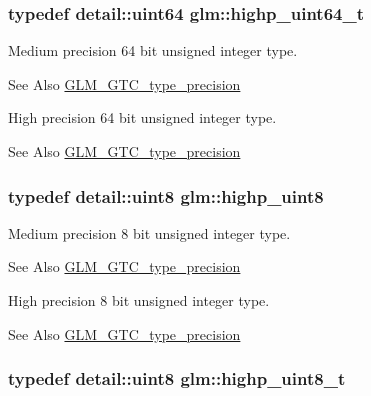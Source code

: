 \hypertarget{group__gtc__type__precision_ga6e66f40c5909bfc872b068187fa6029e}{
\subsubsection[{highp\-\_\-uint64\-\_\-t}]{\setlength{\rightskip}{0pt plus 5cm}typedef detail\-::uint64 {\bf glm\-::highp\-\_\-uint64\-\_\-t}}}\label{group__gtc__type__precision_ga6e66f40c5909bfc872b068187fa6029e}
Medium precision 64 bit unsigned integer type. \begin{DoxySeeAlso}{See Also}
\hyperlink{group__gtc__type__precision}{G\-L\-M\-\_\-\-G\-T\-C\-\_\-type\-\_\-precision}
\end{DoxySeeAlso}
High precision 64 bit unsigned integer type. \begin{DoxySeeAlso}{See Also}
\hyperlink{group__gtc__type__precision}{G\-L\-M\-\_\-\-G\-T\-C\-\_\-type\-\_\-precision} 
\end{DoxySeeAlso}
\hypertarget{group__gtc__type__precision_ga2c27c6dd26e893786f04b10f99c1ee95}{
\subsubsection[{highp\-\_\-uint8}]{\setlength{\rightskip}{0pt plus 5cm}typedef detail\-::uint8 {\bf glm\-::highp\-\_\-uint8}}}\label{group__gtc__type__precision_ga2c27c6dd26e893786f04b10f99c1ee95}
Medium precision 8 bit unsigned integer type. \begin{DoxySeeAlso}{See Also}
\hyperlink{group__gtc__type__precision}{G\-L\-M\-\_\-\-G\-T\-C\-\_\-type\-\_\-precision}
\end{DoxySeeAlso}
High precision 8 bit unsigned integer type. \begin{DoxySeeAlso}{See Also}
\hyperlink{group__gtc__type__precision}{G\-L\-M\-\_\-\-G\-T\-C\-\_\-type\-\_\-precision} 
\end{DoxySeeAlso}
\hypertarget{group__gtc__type__precision_ga9ba529fcc75b82d23da979f0ce6e4518}{
\subsubsection[{highp\-\_\-uint8\-\_\-t}]{\setlength{\rightskip}{0pt plus 5cm}typedef detail\-::uint8 {\bf glm\-::highp\-\_\-uint8\-\_\-t}}}\label{group__gtc__type__precision_ga9ba529fcc75b82d23da979f0ce6e4518}
